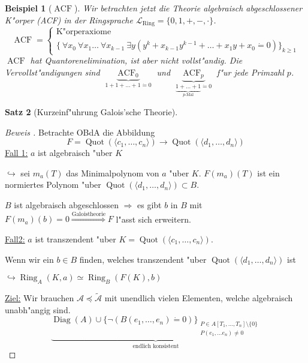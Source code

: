 \documentclass[a4paper,12pt,numbers=noenddot,parskip=full]{scrartcl}
\newcommand{\Forall}{~\forall}
\newcommand{\Exists}{~\exists}
\newcommand{\scrL}{\mathcal{L}}
\newcommand{\scrA}{\mathcal{A}}
\DeclareMathOperator{\Diag}{Diag}
\newcommand{\vdig}{\Diag}
\DeclareMathOperator{\acf}{ACF}
\DeclareMathOperator{\quo}{Quot}
\DeclareMathOperator{\ring}{Ring}
\theoremstyle{dotless}
\newtheorem{theorem}{Satz}[section]
\newtheorem{example}[theorem]{Beispiel}
\theoremstyle{remark}
\begin{document}
\begin{example}[$\acf$]\label{acf:ex}
	Wir betrachten jetzt die Theorie algebraisch abgeschlossener K"orper (ACF) in der Ringsprache $\scrL_\text{Ring}=\{0, 1, +, -, \cdot \}$.
	\begin{equation*}
		\acf = \begin{cases}
		\text{K"orperaxiome}\\
		\{\Forall x_0 \Forall x_1 \dots \Forall x_{k-1} \Exists y (y^k + x_{k-1} y^{k-1} + \dots + x_1 y + x_0 \dot= 0) \}_{k \geq 1}
		\end{cases}
	\end{equation*}
	$\acf$ hat Quantorenelimination, ist aber nicht vollst"andig. Die Vervollst"andigungen sind $\underbrace{\acf_0}_{1+1+ \dots + 1 \dot= 0}$ und $\underbrace{\acf_p}_{\underbrace{1+\dots+1}_{p\text{-Mal}} \dot= 0}$ f"ur jede Primzahl $p$.
\end{example}

\begin{theorem}[Kurzeinf"uhrung Galois'sche Theorie]
\end{theorem}

\begin{proof}[Beweis ]
	Betrachte OBdA die Abbildung
	\begin{equation*}
		F = \quo (\langle c_1, \dots, c_n \rangle) \longrightarrow \quo (\langle d_1, \dots, d_n \rangle)
	\end{equation*}
	\underline{Fall 1:} $a$ ist algebraisch "uber $K$
	
	$\hookrightarrow$ sei $m_a(T)$ das Minimalpolynom von $a$ "uber $K$. $F(m_a)(T)$ ist ein normiertes Polynom "uber $\quo(\langle d_1, \dots, d_n \rangle) \subset B$.
	
	$B$ ist algebraisch abgeschlossen $\Rightarrow$ es gibt $b$ in $B$ mit $F(m_a)(b)=0 \overset{\text{Galoistheorie}}{\Longrightarrow} F$ l"asst sich erweitern. 
	
	\underline{Fall2:} $a$ ist transzendent "uber $K = \quo (\langle c_1, \dots, c_n \rangle)$.
	
	Wenn wir ein $b \in B$ finden, welches transzendent "uber $\quo(\langle d_1, \dots, d_n \rangle)$ ist
	
	$\hookrightarrow \ring_A (K, a) \simeq \ring_B (F(K), b)$
	
	\underline{Ziel:} Wir brauchen $\scrA \preceq \tilde{\scrA}$ mit unendlich vielen Elementen, welche algebraisch unabh"angig sind.
	\begin{equation*}
		\underbrace{\vdig(A) \cup \{\lnot (B(e_1, \dots, e_n)\dot= 0) \}_{\substack{P \in A[T_1, \dots, T_n] \setminus \{0\}\\P(e_1, \dots e_n) \neq 0}}}_{\text{endlich konsistent}}
	\end{equation*}
\end{proof}
\end{document}
